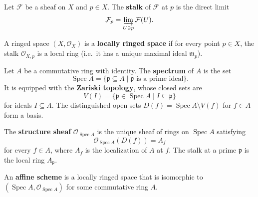 \begin{definition}[Stalk]
    \label{def:stalk}
    \notready
    Let $\mathcal{F}$ be a sheaf on $X$ and $p \in X$. The \textbf{stalk} of $\mathcal{F}$ at $p$ is the direct limit
    \[
        \mathcal{F}_p = \varinjlim_{U \ni p} \mathcal{F}(U).
    \]
\end{definition}

\begin{definition}
    \label{def:locally-ringed-space}
    \notready
    A ringed space $(X, \mathcal{O}_X)$ is a \textbf{locally ringed space} if for every point $p \in X$, the stalk $\mathcal{O}_{X,p}$ is a local ring (i.e.\ it has a unique maximal ideal $\mathfrak{m}_p$).
\end{definition}

\begin{definition}
    \label{def:spectrum}
    \notready
    Let $A$ be a commutative ring with identity. The \textbf{spectrum} of $A$ is the set
    \[
        \operatorname{Spec} A = \{ \mathfrak{p} \subseteq A \mid \mathfrak{p} \text{ is a prime ideal} \}.
    \]
    It is equipped with the \textbf{Zariski topology}, whose closed sets are
    \[
        V(I) = \{ \mathfrak{p} \in \operatorname{Spec} A \mid I \subseteq \mathfrak{p} \}
    \]
    for ideals $I \subseteq A$. The distinguished open sets $D(f) = \operatorname{Spec} A \setminus V(f)$ for $f \in A$ form a basis.
\end{definition}

\begin{definition}
    \label{def:structure-sheaf}
    \notready
    The \textbf{structure sheaf} $\mathcal{O}_{\operatorname{Spec} A}$ is the unique sheaf of rings on $\operatorname{Spec} A$ satisfying
    \[
        \mathcal{O}_{\operatorname{Spec} A}(D(f)) = A_f
    \]
    for every $f \in A$, where $A_f$ is the localization of $A$ at $f$. The stalk at a prime $\mathfrak{p}$ is the local ring $A_{\mathfrak{p}}$.
\end{definition}

\begin{definition}
    \label{def:affine-scheme}
    \notready
    An \textbf{affine scheme} is a locally ringed space that is isomorphic to $(\operatorname{Spec} A, \mathcal{O}_{\operatorname{Spec} A})$ for some commutative ring $A$.
\end{definition}

